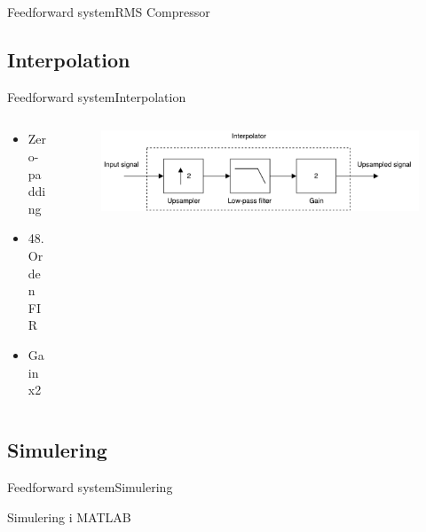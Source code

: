 \documentclass[10pt,aspectratio=169]{beamer}
\begin{document}
\begin{frame}{Feedforward system}{RMS Compressor}
\end{frame}




\subsection{Interpolation}
\begin{frame}{Feedforward system}{Interpolation}

\begin{columns}
  \begin{column}{0.4\textwidth}
\begin{itemize}
\item Zero-padding
\item 48. Orden FIR
\item Gain x2
\end{itemize}
  \end{column}

  \begin{column}{0.6\textwidth}
\begin{figure}
\centering
\includegraphics[width=\textwidth]{designRealInterpolator}
\end{figure}
  \end{column}
\end{columns}

\end{frame}



\subsection{Simulering}
\begin{frame}{Feedforward system}{Simulering}

\begin{center}
Simulering i MATLAB
\end{center}

\end{frame}
\end{document}
